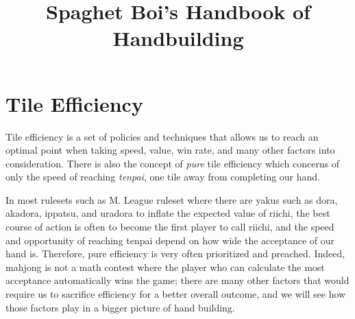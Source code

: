 \documentclass[12pt]{article}
\newcommand{\onlyinsubfile}[1]{#1}
\newcommand{\notinsubfile}[1]{}
\begin{document}
\renewcommand{\onlyinsubfile}[1]{}
\renewcommand{\notinsubfile}[1]{#1}

\title{Spaghet Boi's Handbook of Handbuilding}
\renewcommand\maketitlehookc{\vspace{-2ex}}
\maketitle

\tableofcontents

%
%
%
%
%
%
%
%
%
%
%

\section{Tile Efficiency} \label{sec:tile-eff}

Tile efficiency is a set of policies and techniques that allows us to reach an optimal point when taking speed, value, win rate, and many other factors into consideration. There is also the concept of \textit{pure} tile efficiency which concerns of only the speed of reaching \textit{tenpai}, one tile away from completing our hand. 

In most rulesets such as M. League ruleset where there are yakus such as dora, akadora, ippatsu, and uradora to inflate the expected value of riichi, the best course of action is often to become the first player to call riichi, and the speed and opportunity of reaching tenpai depend on how wide the acceptance of our hand is. Therefore, pure efficiency is very often prioritized and preached. Indeed, mahjong is not a math contest where the player who can calculate the most acceptance automatically wins the game; there are many other factors that would require us to sacrifice efficiency for a better overall outcome, and we will see how those factors play in a bigger picture of hand building.
\end{document}
